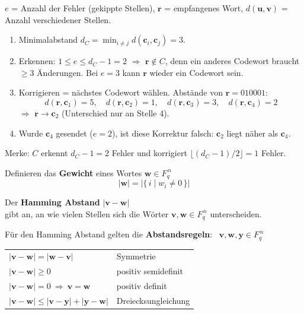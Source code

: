 \begin{bemerkung}
$e$ = Anzahl der Fehler (gekippte Stellen), $\mathbf{r}$ = empfangenes Wort, $d(\mathbf{u}, \mathbf{v})$ = Anzahl verschiedener Stellen.
\begin{enumerate}
\item Minimalabstand $d_C = \min_{i \neq j} d(\mathbf{c}_i, \mathbf{c}_j) = 3$.
\item Erkennen: $1 \le e \le d_C - 1 = 2$ $\Rightarrow$ $\mathbf{r} \notin C$, denn ein anderes Codewort braucht $\ge 3$ Änderungen.
      Bei $e = 3$ kann $\mathbf{r}$ wieder ein Codewort sein.
\item Korrigieren = nächstes Codewort wählen. Abstände von $\mathbf{r} = 010001$:
\[
d(\mathbf{r}, \mathbf{c}_1) = 5, \quad d(\mathbf{r}, \mathbf{c}_2) = 1, \quad d(\mathbf{r}, \mathbf{c}_3) = 3, \quad d(\mathbf{r}, \mathbf{c}_4) = 2
\]
$\Rightarrow$ $\mathbf{r} \to \mathbf{c}_2$ (Unterschied nur an Stelle 4).
\item Wurde $\mathbf{c}_4$ gesendet ($e = 2$), ist diese Korrektur falsch: $\mathbf{c}_2$ liegt näher als $\mathbf{c}_4$.
\end{enumerate}
Merke: $C$ erkennt $d_C - 1 = 2$ Fehler und korrigiert $\lfloor (d_C - 1)/2 \rfloor = 1$ Fehler.
\end{bemerkung}

\begin{definition}[Gewicht]
Definieren das \textbf{Gewicht} eines Wortes $\mathbf{w} \in F_q^{\,n}$
\[ |\mathbf{w}| = |\{\, i \mid w_i \neq 0 \,\}| \]
\end{definition}

\begin{definition}
Der \textbf{Hamming Abstand} \quad $|\mathbf{v}-\mathbf{w}|$\\
gibt an, an wie vielen Stellen sich die Wörter $\mathbf{v}, \mathbf{w} \in F_q^{\,n}$ unterscheiden.
\end{definition}

Für den Hamming Abstand gelten die \textbf{Abstandsregeln}: \ $\mathbf{v}, \mathbf{w}, \mathbf{y} \in F_q^{\,n}$
\begin{center}
\begin{tabular}{ll}
$|\mathbf{v}-\mathbf{w}| = |\mathbf{w}-\mathbf{v}|$ & Symmetrie \\
$|\mathbf{v}-\mathbf{w}| \geq 0$ & positiv semidefinit \\
$|\mathbf{v}-\mathbf{w}| = 0 \ \Rightarrow \ \mathbf{v} = \mathbf{w}$ & positiv definit \\
$|\mathbf{v}-\mathbf{w}| \leq |\mathbf{v}-\mathbf{y}| + |\mathbf{y}-\mathbf{w}|$ & Dreiecksungleichung \\
\end{tabular}
\end{center}

